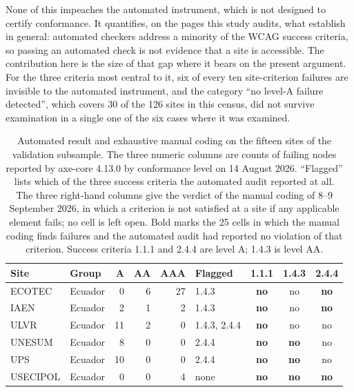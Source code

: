 \documentclass[pdflatex,sn-basic,Numbered,iicol]{sn-jnl}
\theoremstyle{thmstyleone}
\theoremstyle{thmstyletwo}
\theoremstyle{thmstylethree}
\begin{document}
None of this impeaches the automated instrument, which is not designed to certify conformance. It quantifies, on the pages this study audits, what \citet{fischer2025coverage} establish in general: automated checkers address a minority of the WCAG success criteria, so passing an automated check is not evidence that a site is accessible. The contribution here is the size of that gap where it bears on the present argument. For the three criteria most central to it, six of every ten site-criterion failures are invisible to the automated instrument, and the category ``no level-A failure detected'', which covers 30 of the 126 sites in this census, did not survive examination in a single one of the six cases where it was examined.

\begin{table}[htbp]
	\centering
	\caption{Automated result and exhaustive manual coding on the fifteen sites of the validation subsample. The three numeric columns are counts of failing nodes reported by axe-core 4.13.0 by conformance level on 14 August 2026. ``Flagged'' lists which of the three success criteria the automated audit reported at all. The three right-hand columns give the verdict of the manual coding of 8--9 September 2026, in which a criterion is not satisfied at a site if any applicable element fails; no cell is left open. Bold marks the 25 cells in which the manual coding finds failures and the automated audit had reported no violation of that criterion. Success criteria 1.1.1 and 2.4.4 are level A; 1.4.3 is level AA.}\label{tab:manual}
	\begin{tabular}{llrrrlccc}
		\toprule
		Site & Group & A & AA & AAA & Flagged & 1.1.1 & 1.4.3 & 2.4.4 \\
		\midrule
		ECOTEC       & Ecuador &  0 &  6 & 27 & 1.4.3               & \textbf{no} & no          & \textbf{no} \\
		IAEN         & Ecuador &  2 &  1 &  2 & 1.4.3               & \textbf{no} & no          & \textbf{no} \\
		ULVR         & Ecuador & 11 &  2 &  0 & 1.4.3, 2.4.4        & \textbf{no} & no          & no          \\
		UNESUM       & Ecuador &  8 &  0 &  0 & 2.4.4               & \textbf{no} & \textbf{no} & no          \\
		UPS          & Ecuador & 10 &  0 &  0 & 2.4.4               & \textbf{no} & \textbf{no} & no          \\
		USECIPOL     & Ecuador &  0 &  0 &  4 & none                & \textbf{no} & \textbf{no} & \textbf{no} \\

\end{tabular}
\end{table}
\end{document}
